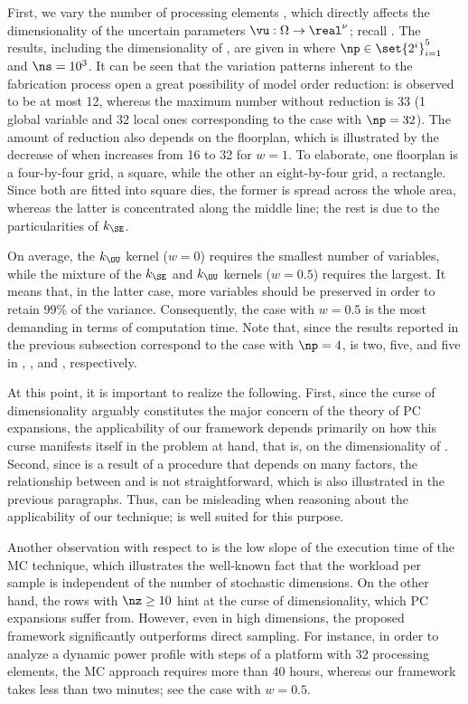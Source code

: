 First, we vary the number of processing elements \np, which directly affects the
dimensionality of the uncertain parameters $\vu: \Omega \to \real^\nu$; recall
. The results, including the dimensionality
\nz of \vz, are given in  where $\np \in
\set{2^i}_{i = 1}^5$ and $\ns = 10^3$. It can be seen that the variation
patterns inherent to the fabrication process \cite{cheng2011} open a great
possibility of model order reduction: \nz is observed to be at most 12, whereas
the maximum number without reduction is 33 (1 global variable and 32 local ones
corresponding to the case with $\np = 32$). The amount of reduction also depends
on the floorplan, which is illustrated by the decrease of \nz when \np increases
from 16 to 32 for $w = 1$. To elaborate, one floorplan is a four-by-four grid, a
square, while the other an eight-by-four grid, a rectangle. Since both are
fitted into square dies, the former is spread across the whole area, whereas the
latter is concentrated along the middle line; the rest is due to the
particularities of $k_\SE$.

On average, the $k_\OU$ kernel ($w = 0$) requires the smallest number of
variables, while the mixture of the $k_\SE$ and $k_\OU$ kernels ($w = 0.5$)
requires the largest. It means that, in the latter case, more variables should
be preserved in order to retain 99\% of the variance. Consequently, the case
with $w = 0.5$ is the most demanding in terms of computation time. Note that,
since the results reported in the previous subsection correspond to the case
with $\np = 4$, \nz is two, five, and five in ,
, and ,
respectively.

At this point, it is important to realize the following. First, since the curse
of dimensionality arguably constitutes the major concern of the theory of
\ac{PC} expansions, the applicability of our framework depends primarily on how
this curse manifests itself in the problem at hand, that is, on the
dimensionality \nz of \vz. Second, since \vz is a result of a procedure that
depends on many factors, the relationship between \vu and \vz is not
straightforward, which is also illustrated in the previous paragraphs. Thus, \nu
can be misleading when reasoning about the applicability of our technique; \nz
is well suited for this purpose.

Another observation with respect to  is the
low slope of the execution time of the \ac{MC} technique, which illustrates the
well-known fact that the workload per sample is independent of the number of
stochastic dimensions. On the other hand, the rows with $\nz \geq 10$ hint at
the curse of dimensionality, which \ac{PC} expansions suffer from. However, even
in high dimensions, the proposed framework significantly outperforms direct
sampling. For instance, in order to analyze a dynamic power profile with
 steps of a platform with 32 processing elements, the \ac{MC}
approach requires more than 40 hours, whereas our framework takes less than two
minutes; see the case with $w = 0.5$.

